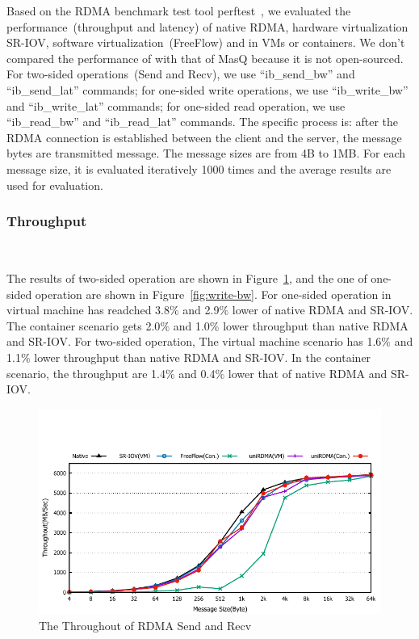 Based on the RDMA benchmark test tool perftest~\cite{perftest}, we evaluated the performance~(throughput and latency) of native RDMA, hardware virtualization SR-IOV,  software virtualization~(FreeFlow) and \sys in VMs or containers. We don't compared the performance of \sys with that of MasQ because it is not open-sourced. For two-sided operations~(Send and Recv), we use ``ib\_send\_bw'' and ``ib\_send\_lat'' commands; for one-sided write operations, we use ``ib\_write\_bw'' and ``ib\_write\_lat'' commands; for one-sided read operation, we use ``ib\_read\_bw'' and ``ib\_read\_lat'' commands. The specific process is: after the RDMA connection is established between the client and the server, the message bytes are transmitted message. The message sizes are from 4B to 1MB. For each message size,  it is evaluated iteratively 1000 times and the average results are used for evaluation.  

\subsubsection{\textbf{Throughput}}
\
\noindent

The results of two-sided operation are shown in Figure~\ref{fig:send-bw}, and the one of one-sided operation are shown in Figure~\ref{fig:write-bw}. For one-sided operation \sys in virtual machine has readched 3.8$\%$ and 2.9$\%$ lower of native RDMA and SR-IOV. The container scenario gets 2.0$\%$ and 1.0$\%$ lower throughput than native RDMA and SR-IOV. For two-sided operation, The virtual machine scenario has 1.6$\%$ and 1.1$\%$ lower throughput than native RDMA and SR-IOV. In the container scenario, the throughput are 1.4$\%$ and 0.4$\%$ lower that of native RDMA and SR-IOV.

\begin{figure}[!ht]
	\centering
	\includegraphics[width=1.0\linewidth]{images/send-bw.pdf}
	\caption{The Throughout of RDMA Send and Recv}
	\label{fig:send-bw}
\end{figure}

